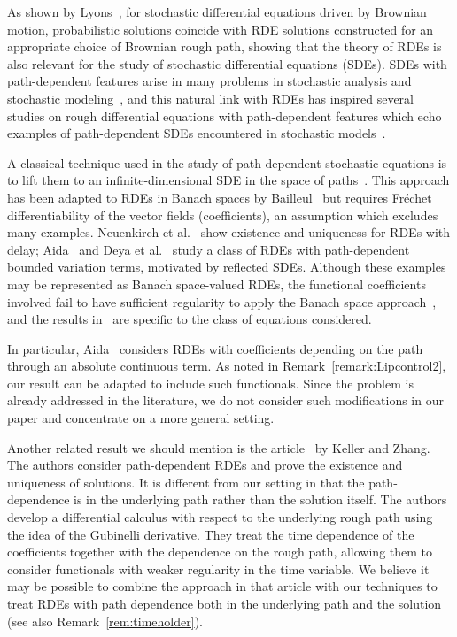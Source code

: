 \documentclass[10pt]{amsart}
\theoremstyle{definition}\newtheorem{defi}[theo]{Definition}\newtheorem{rema}[theo]{Remark}\newtheorem{exam}[theo]{Example}\newtheorem{exem}[theo]{Example}\newtheorem{nota}[theo]{Notation}
\begin{document}
As shown by Lyons~\cite{lyons98}, for stochastic differential equations driven by Brownian motion, probabilistic solutions coincide with RDE solutions constructed for an appropriate choice of Brownian rough path, showing that the theory of RDEs is also relevant for the study of stochastic differential equations (SDEs). SDEs with path-dependent features arise in many problems in stochastic analysis and stochastic modeling~\cite{ItoNis, Kush, Moh}, and this natural link with RDEs has inspired several studies on rough differential equations with path-dependent features which echo examples of path-dependent SDEs encountered in stochastic models~\cite{bailleul2014, deya2019,neuenkirch2008,aida2019}.


A classical technique used in the study of path-dependent stochastic equations is to lift them to an infinite-dimensional SDE in the space of paths~\cite{Moh}. This approach has been adapted to RDEs in Banach spaces by Bailleul~\cite{bailleul2014} but requires Fréchet differentiability of the vector fields (coefficients), an assumption which excludes many examples. Neuenkirch et al.~\cite{neuenkirch2008} show existence and uniqueness for RDEs with delay; Aida~\cite{aida2019} and Deya et al.~\cite{deya2019} study a class of RDEs with path-dependent bounded variation terms, motivated by reflected SDEs. Although these examples may be represented as Banach space-valued RDEs, the functional coefficients involved fail to have sufficient regularity to apply the Banach space approach~\cite{bailleul2014}, and the results in~\cite{deya2019,neuenkirch2008,aida2019} are specific to the class of equations considered.

In particular, Aida~\cite{aida2019} considers RDEs with coefficients depending on the path through an absolute continuous term. As noted in Remark~\ref{remark:Lipcontrol2}, our result can be adapted to include such functionals. Since the problem is already addressed in the literature, we do not consider such modifications in our paper and concentrate on a more general setting.

Another related result we should mention is the article~\cite{KellerZhang} by Keller and Zhang. The authors consider path-dependent RDEs and prove the existence and uniqueness of solutions. It is different from our setting in that the path-dependence is in the underlying path rather than the solution itself. The authors develop a differential calculus with respect to the underlying rough path using the idea of the Gubinelli derivative. They treat the time dependence of the coefficients together with the dependence on the rough path, allowing them to consider functionals with weaker regularity in the time variable. We believe it may be possible to combine the approach in that article with our techniques to treat RDEs with path dependence both in the underlying path and the solution (see also Remark~\ref{rem:timeholder}).
\end{document}
